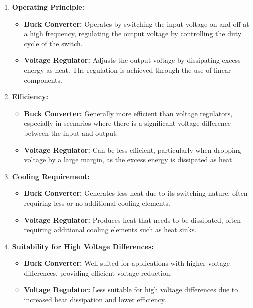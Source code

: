 \begin{enumerate}
  \item \textbf{Operating Principle:}
    \begin{itemize}
      \item \textbf{Buck Converter:} Operates by switching the input voltage on and off at a high frequency, regulating the output voltage by controlling the duty cycle of the switch.
      \item \textbf{Voltage Regulator:} Adjusts the output voltage by dissipating excess energy as heat. The regulation is achieved through the use of linear components.
    \end{itemize}
  \item \textbf{Efficiency:}
    \begin{itemize}
      \item \textbf{Buck Converter:} Generally more efficient than voltage regulators, especially in scenarios where there is a significant voltage difference between the input and output.
      \item \textbf{Voltage Regulator:} Can be less efficient, particularly when dropping voltage by a large margin, as the excess energy is dissipated as heat.
    \end{itemize}
  \item \textbf{Cooling Requirement:}
    \begin{itemize}
      \item \textbf{Buck Converter:} Generates less heat due to its switching nature, often requiring less or no additional cooling elements.
      \item \textbf{Voltage Regulator:} Produces heat that needs to be dissipated, often requiring additional cooling elements such as heat sinks.
    \end{itemize}
  \item \textbf{Suitability for High Voltage Differences:}
    \begin{itemize}
      \item \textbf{Buck Converter:} Well-suited for applications with higher voltage differences, providing efficient voltage reduction.
      \item \textbf{Voltage Regulator:} Less suitable for high voltage differences due to increased heat dissipation and lower efficiency.
    \end{itemize}
\end{enumerate}


